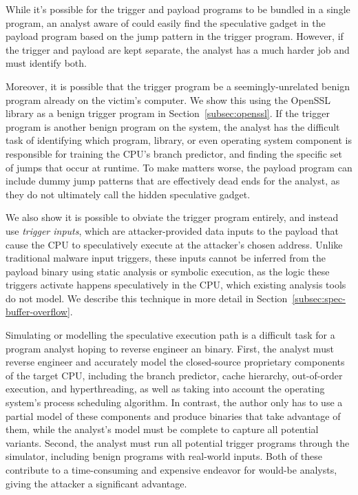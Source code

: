 

\FigHighLevel



While it's possible for the trigger and payload programs to be bundled in a
single program, an analyst aware of \speculake could easily find the speculative
gadget in the payload program based on the jump pattern in the trigger program.
However, if the trigger and payload are kept separate, the analyst has a much
harder job and must identify both.

Moreover, it is possible that the trigger program be a
seemingly-unrelated benign program already on the victim's computer. We
show this using the OpenSSL library as a benign trigger
program in Section~\ref{subsec:openssl}. If the trigger program is another benign
program on the system, the analyst has the difficult task of identifying which
program, library, or even operating system component is responsible for training
the CPU's branch predictor, and finding the specific set of jumps that occur at
runtime. To make matters worse, the payload program can include dummy jump
patterns that are effectively dead ends for the analyst, as they do not
ultimately call the hidden speculative gadget.

We also show it is possible to obviate the trigger program entirely, and
instead use \emph{trigger inputs}, which are attacker-provided data inputs to
the payload that cause the CPU to speculatively execute
at the attacker's chosen address. Unlike traditional malware input triggers, these inputs
cannot be inferred from the payload binary using static analysis or symbolic
execution, as the logic these triggers activate happens speculatively in the
CPU, which existing analysis tools do not model. We describe this technique in
more detail in Section~\ref{subsec:spec-buffer-overflow}.

Simulating or modelling the speculative execution path is a difficult task for a
program analyst hoping to reverse engineer an \speculake binary. First, the
analyst must reverse engineer and accurately model the closed-source proprietary
components of the target CPU, including the branch predictor, cache hierarchy,
out-of-order execution, and hyperthreading, as well as taking into account the
operating system's process scheduling algorithm. In contrast, the \speculake
author only has to use a partial model of these components and produce binaries
that take advantage of them, while the analyst's model must be complete to
capture all potential \speculake variants. Second, the analyst must run all
potential trigger programs through the simulator, including benign programs with
real-world inputs. Both of these contribute to a time-consuming and expensive
endeavor for would-be analysts, giving the attacker a significant advantage.

